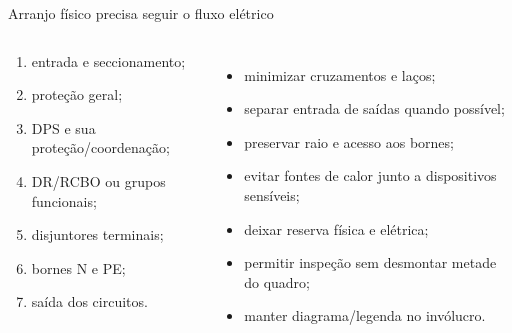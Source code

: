 \begin{frame}{Arranjo físico precisa seguir o fluxo elétrico}
\small
\begin{columns}[T,onlytextwidth]
\begin{caixaProjeto}[title=Fluxo recomendado]
\begin{enumerate}
\item entrada e seccionamento;
\item proteção geral;
\item DPS e sua proteção/coordenação;
\item DR/RCBO ou grupos funcionais;
\item disjuntores terminais;
\item bornes N e PE;
\item saída dos circuitos.
\end{enumerate}
\end{caixaProjeto}
\begin{itemize}
\item minimizar cruzamentos e laços;
\item separar entrada de saídas quando possível;
\item preservar raio e acesso aos bornes;
\item evitar fontes de calor junto a dispositivos sensíveis;
\item deixar reserva física e elétrica;
\item permitir inspeção sem desmontar metade do quadro;
\item manter diagrama/legenda no invólucro.
\end{itemize}
\end{columns}
\end{frame}

